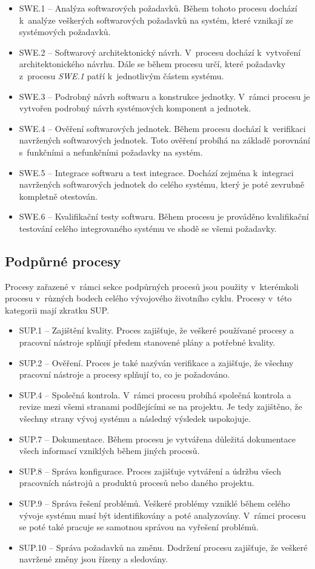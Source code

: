 \documentclass[czech,master]{diploma}
\begin{document}
\begin{itemize}
\item SWE.1 -- Analýza softwarových požadavků. Během tohoto procesu dochází k~analýze veškerých softwarových požadavků na systém, které vznikají ze systémových požadavků.
\item SWE.2 -- Softwarový architektonický návrh. V~procesu dochází k~vytvoření architektonického návrhu. Dále se během procesu určí, které požadavky z~procesu \textit{SWE.1} patří k~jednotlivým částem systému.
\item SWE.3 -- Podrobný návrh softwaru a konstrukce jednotky. V~rámci procesu je vytvořen podrobný návrh systémových komponent a jednotek.
\item SWE.4 -- Ověření softwarových jednotek. Během procesu dochází k~verifikaci navržených softwarových jednotek. Toto ověření probíhá na základě porovnání s~funkčními a nefunkčními požadavky na systém.
\item SWE.5 -- Integrace softwaru a test integrace. Dochází zejména k~integraci navržených softwarových jednotek do celého systému, který je poté zevrubně kompletně otestován.
\item SWE.6 -- Kvalifikační testy softwaru. Během procesu je prováděno kvalifikační testování celého integrovaného systému ve shodě se všemi požadavky.
\end{itemize}

\subsection{Podpůrné procesy}
Procesy zařazené v~rámci sekce podpůrných procesů jsou použity v~kterémkoli procesu v~různých bodech celého vývojového životního cyklu. Procesy v~této kategorii mají zkratku SUP.

\begin{itemize}
\item SUP.1 -- Zajištění kvality. Proces zajišťuje, že veškeré používané procesy a pracovní nástroje splňují předem stanovené plány a potřebné kvality.
\item SUP.2 -- Ověření. Proces je také nazýván verifikace a zajišťuje, že všechny pracovní nástroje a procesy splňují to, co je požadováno.
\item SUP.4 -- Společná kontrola. V~rámci procesu probíhá společná kontrola a revize mezi všemi stranami podílejícími se na projektu. Je tedy zajištěno, že všechny strany vývoj systému a následný výsledek uspokojuje.
\item SUP.7 -- Dokumentace. Během procesu je vytvářena důležitá dokumentace všech informací vzniklých během jiných procesů.
\item SUP.8 -- Správa konfigurace. Proces zajišťuje vytváření a údržbu všech pracovních nástrojů a produktů procesů nebo daného projektu.
\item SUP.9 -- Správa řešení problémů. Veškeré problémy vzniklé během celého vývoje systému musí být identifikovány a poté analyzovány. V~rámci procesu se poté také pracuje se samotnou správou na vyřešení problémů.
\item SUP.10 -- Správa požadavků na změnu. Dodržení procesu zajišťuje, že veškeré navržené změny jsou řízeny a sledovány.
\end{itemize}
\end{document}

